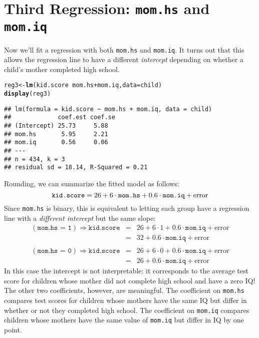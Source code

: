 \documentclass[12pt]{article}\usepackage[]{graphicx}\usepackage[]{color}
\makeatletter
\newcommand{\hlopt}[1]{\textcolor[rgb]{0,0,0}{#1}}%
\newcommand{\hlstd}[1]{\textcolor[rgb]{0.345,0.345,0.345}{#1}}%
\newcommand{\hlkwb}[1]{\textcolor[rgb]{0.69,0.353,0.396}{#1}}%
\newcommand{\hlkwc}[1]{\textcolor[rgb]{0.333,0.667,0.333}{#1}}%
\newcommand{\hlkwd}[1]{\textcolor[rgb]{0.737,0.353,0.396}{\textbf{#1}}}%
\newenvironment{kframe}{%
 \def\at@end@of@kframe{}%
 \ifinner\ifhmode%
  \def\at@end@of@kframe{\end{minipage}}%
  \begin{minipage}{\columnwidth}%
 \fi\fi%
 \def\FrameCommand##1{\hskip\@totalleftmargin \hskip-\fboxsep
 \colorbox{shadecolor}{##1}\hskip-\fboxsep
     \hskip-\linewidth \hskip-\@totalleftmargin \hskip\columnwidth}%
 \MakeFramed {\advance\hsize-\width
   \@totalleftmargin\z@ \linewidth\hsize
   \@setminipage}}%
 {\par\unskip\endMakeFramed%
 \at@end@of@kframe}
\newenvironment{knitrout}{}{} %
\makeatother
\begin{document}
\section*{Third Regression: \texttt{mom.hs} and \texttt{mom.iq}}
Now we'll fit a regression with both \texttt{mom.hs} and \texttt{mom.iq}.
It turns out that this allows the regression line to have a different \emph{intercept} depending on whether a child's mother completed high school.
\begin{knitrout}
\color{fgcolor}\begin{kframe}
\begin{alltt}
\hlstd{reg3} \hlkwb{<-} \hlkwd{lm}\hlstd{(kid.score} \hlopt{~} \hlstd{mom.hs} \hlopt{+} \hlstd{mom.iq,} \hlkwc{data} \hlstd{= child)}
\hlkwd{display}\hlstd{(reg3)}
\end{alltt}
\begin{verbatim}
## lm(formula = kid.score ~ mom.hs + mom.iq, data = child)
##             coef.est coef.se
## (Intercept) 25.73     5.88  
## mom.hs       5.95     2.21  
## mom.iq       0.56     0.06  
## ---
## n = 434, k = 3
## residual sd = 18.14, R-Squared = 0.21
\end{verbatim}
\end{kframe}
\end{knitrout}
Rounding, we can summarize the fitted model as follows:
  $$\mbox{\texttt{kid.score}} = 26 + 6 \cdot \mbox{\texttt{mom.hs}} +0.6 \cdot \mbox{\texttt{mom.iq}} + \mbox{error} $$
  Since \texttt{mom.hs} is binary, this is equivalent to letting each group have a regression line with a \emph{different intercept} but the same slope:
  \begin{eqnarray*}
    (\texttt{mom.hs = 1})\Rightarrow \texttt{kid.score} &=& 26 + 6 \cdot 1 + 0.6\cdot \texttt{mom.iq} + \mbox{error}\\
      &=& 32 + 0.6\cdot \texttt{mom.iq} + \mbox{error}\\ \\
    (\texttt{mom.hs = 0})\Rightarrow \texttt{kid.score} &=& 26 + 6 \cdot 0 + 0.6\cdot \texttt{mom.iq} + \mbox{error}\\
      &=&26 + 0.6\cdot \texttt{mom.iq} + \mbox{error}
  \end{eqnarray*}
In this case the intercept is not interpretable: it corresponds to the average test score for children whose mother did not complete high school and have a zero IQ! The other two coefficients, however, are meaningful. The coefficient on \texttt{mom.hs} compares test scores for children whose mothers have the same IQ but differ in whether or not they completed high school. The coefficient on \texttt{mom.iq} compares children whose mothers have the same value of \texttt{mom.iq} but differ in IQ by one point. 
\end{document}
